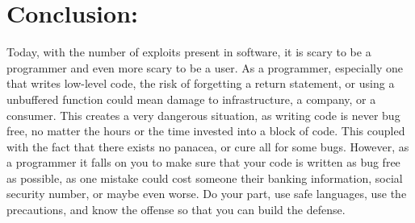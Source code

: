 \documentclass{article}
\newcommand\tab[1][1cm]{\hspace*{#1}}
\begin{document}
\section{Conclusion:}
\tab Today, with the number of exploits present in software, it is scary to be a programmer and even more scary to be a user. As a programmer, especially one that writes low-level code, the risk of forgetting a return statement, or using a unbuffered function could mean damage to infrastructure, a company, or a consumer. This creates a very dangerous situation, as writing code is never bug free, no matter the hours or the time invested into a block of code. This coupled with the fact that there exists no panacea, or cure all for some bugs. However, as a programmer it falls on you to make sure that your code is written as bug free as possible, as one mistake could cost someone their banking information, social security number, or maybe even worse. Do your part, use safe languages, use the precautions, and know the offense so that you can build the defense.
\end{document}
